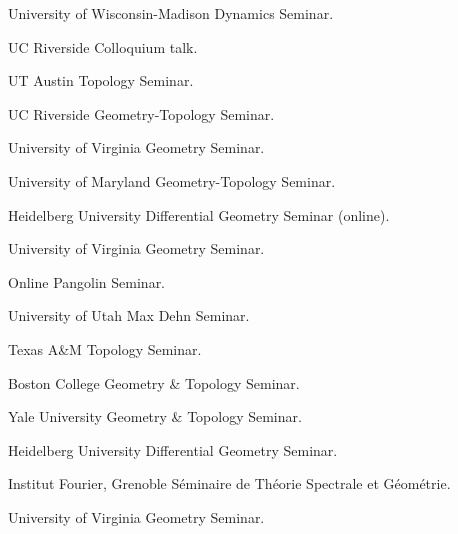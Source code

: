 {University of Wisconsin-Madison}
{Dynamics Seminar.}
{}

{UC Riverside}
{Colloquium talk.}
{}

{UT Austin}
{Topology Seminar.}
{}

{UC Riverside}
{Geometry-Topology Seminar.}
{}

{University of Virginia}
{Geometry Seminar.}
{}

{University of Maryland}
{Geometry-Topology Seminar.}
{}

{Heidelberg University}
{Differential Geometry Seminar (online).}
{}

{University of Virginia}
{Geometry Seminar.}
{}

{Online}
{Pangolin Seminar.}
{}

{University of Utah}
{Max Dehn Seminar.}
{}

{Texas A\&M}
{Topology Seminar.}
{}

{Boston College}
{Geometry \& Topology Seminar.}
{}

{Yale University}
{Geometry \& Topology Seminar.}
{}

{Heidelberg University}
{Differential Geometry Seminar.}
{}

{Institut Fourier, Grenoble}
{S\'eminaire de Th\'eorie Spectrale et G\'eom\'etrie.}
{}

{University of Virginia}
{Geometry Seminar.}
{}



